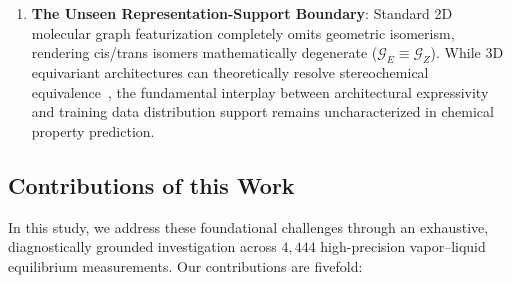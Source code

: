 \begin{enumerate}
    \item \textbf{The Unseen Representation-Support Boundary}: Standard 2D molecular graph featurization completely omits geometric isomerism, rendering cis/trans isomers mathematically degenerate ($\mathcal{G}_E \equiv \mathcal{G}_Z$). While 3D equivariant architectures can theoretically resolve stereochemical equivalence~\cite{Morehead2024_GCPNet,Adams2024_GeomComplete,Schwaller2024_3DGeom}, the fundamental interplay between architectural expressivity and training data distribution support remains uncharacterized in chemical property prediction.
\end{enumerate}

\subsection*{Contributions of this Work}
In this study, we address these foundational challenges through an exhaustive, diagnostically grounded investigation across $4,444$ high-precision vapor--liquid equilibrium measurements. Our contributions are fivefold:


